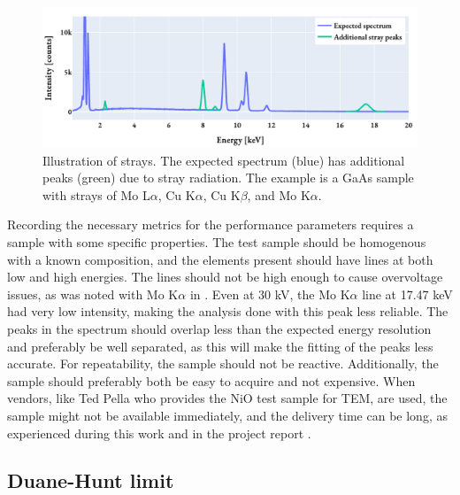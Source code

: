 \begin{figure}[htp]
    \centering
    \includegraphics[width=0.8\linewidth]{figures/pp_strays.pdf}
    \caption{
        Illustration of strays.
        The expected spectrum (blue) has additional peaks (green) due to stray radiation.
        The example is a GaAs sample with strays of Mo L$\alpha$, Cu K$\alpha$, Cu K$\beta$, and Mo K$\alpha$.
    }
    \label{fig:theory:eds_performance:overview:strays}
\end{figure}




Recording the necessary metrics for the performance parameters requires a sample with some specific properties.
The test sample should be homogenous with a known composition, and the elements present should have lines at both low and high energies.
The lines should not be high enough to cause overvoltage issues, as was noted with Mo K$\alpha$ in \cite{project_report}.
Even at 30 kV, the Mo K$\alpha$ line at 17.47 keV had very low intensity, making the analysis done with this peak less reliable.
The peaks in the spectrum should overlap less than the expected energy resolution and preferably be well separated, as this will make the fitting of the peaks less accurate.
For repeatability, the sample should not be reactive.
Additionally, the sample should preferably both be easy to acquire and not expensive.
When vendors, like Ted Pella who provides the NiO test sample for TEM, are used, the sample might not be available immediately, and the delivery time can be long, as experienced during this work and in the project report \cite{project_report}.







\subsection{Duane-Hunt limit}
\label{theory:eds_performance:duanehunt}

